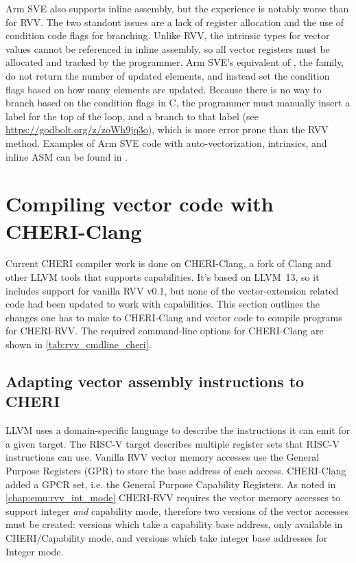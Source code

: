 \documentclass[../thesis]{subfiles}
\begin{document}
Arm SVE also supports inline assembly, but the experience is notably worse than for RVV.
The two standout issues are a lack of register allocation and the use of condition code flags for branching.
Unlike RVV, the intrinsic types for vector values cannot be referenced in inline assembly\cite{stephensARMScalableVector2017}, so all vector registers must be allocated and tracked by the programmer.
Arm SVE's equivalent of , the  family\cite{armltdARMLanguageExtensions2020}, do not return the number of updated elements, and instead set the condition flags based on how many elements are updated.
Because there is no way to branch based on the condition flags in C, the programmer must manually insert a label for the top of the loop, and a branch to that label (see \url{https://godbolt.org/z/zoWh9jq3o}), which is more error prone than the RVV method.
Examples of Arm SVE code with auto-vectorization, intrinsics, and inline ASM can be found in .


\pagebreak
\section{Compiling vector code with CHERI-Clang}\label{chap:software:sec:chericlang}
Current CHERI compiler work is done on CHERI-Clang, a fork of Clang and other LLVM tools that supports capabilities.
It's based on LLVM~13, so it includes support for vanilla RVV v0.1, but none of the vector-extension related code had been updated to work with capabilities.
This section outlines the changes one has to make to CHERI-Clang and vector code to compile programs for CHERI-RVV.
The required command-line options for CHERI-Clang are shown in \cref{tab:rvv_cmdline_cheri}.

\subsection{Adapting vector assembly instructions to CHERI}\label{addingtochericlang}
LLVM uses a domain-specific language to describe the instructions it can emit for a given target.
The RISC-V target describes multiple register sets that RISC-V instructions can use.
Vanilla RVV vector memory accesses use the General Purpose Registers (GPR) to store the base address of each access.
CHERI-Clang added a GPCR set, i.e. the General Purpose Capability Registers.
As noted in \cref{chap:emu:rvv_int_mode} CHERI-RVV requires the vector memory accesses to support integer \emph{and} capability mode, therefore two versions of the vector accesses must be created: versions which take a capability base address, only available in CHERI/Capability mode, and versions which take integer base addresses for Integer mode.
\end{document}
